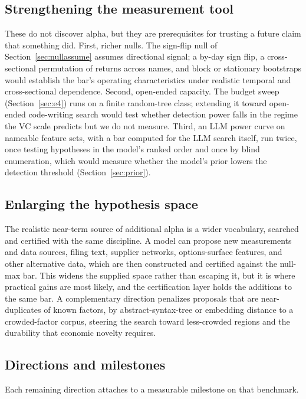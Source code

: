 \documentclass[11pt]{article}
\begin{document}
\subsection{Strengthening the measurement tool}
\label{sec:future}

These do not discover alpha, but they are prerequisites for trusting a future claim that something
did. First, richer nulls. The sign-flip null of Section~\ref{sec:nullassume} assumes directional
signal; a by-day sign flip, a cross-sectional permutation of returns across names, and block or
stationary bootstraps would establish the bar's operating characteristics under realistic temporal and
cross-sectional dependence. Second, open-ended capacity. The budget sweep (Section~\ref{sec:e4}) runs
on a finite random-tree class; extending it toward open-ended code-writing search would test whether
detection power falls in the regime the VC scale predicts but we do not measure. Third, an LLM power
curve on nameable feature sets, with a bar computed for the LLM search itself, run twice, once testing
hypotheses in the model's ranked order and once by blind enumeration, which would measure whether the
model's prior lowers the detection threshold (Section~\ref{sec:prior}).

\subsection{Enlarging the hypothesis space}

The realistic near-term source of additional alpha is a wider vocabulary, searched and certified with
the same discipline. A model can propose new measurements and data sources, filing text, supplier
networks, options-surface features, and other alternative data, which are then constructed and
certified against the null-max bar. This widens the supplied space rather than escaping it, but it is
where practical gains are most likely, and the certification layer holds the additions to the same bar. A
complementary direction penalizes proposals that are near-duplicates of known factors, by
abstract-syntax-tree or embedding distance to a crowded-factor corpus, steering the search toward
less-crowded regions and the durability that economic novelty requires.

\subsection{Directions and milestones}
\label{sec:milestones}

Each remaining direction attaches to a measurable milestone on that benchmark.
\end{document}
